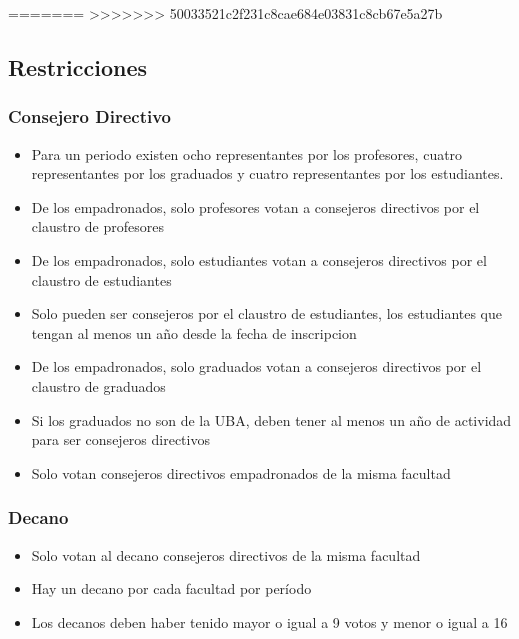 \documentclass[a4paper, 10pt, twoside]{article}
\begin{document}
=======
>>>>>>> 50033521c2f231c8cae684e03831c8cb67e5a27b

\subsection{Restricciones}


\subsubsection{Consejero Directivo}

\begin{itemize}
\item Para un periodo existen ocho representantes por los profesores, cuatro representantes por los graduados y cuatro representantes por los estudiantes.
\item De los empadronados, solo profesores votan a consejeros directivos por el claustro de profesores
\item De los empadronados, solo estudiantes votan a consejeros directivos por el claustro de estudiantes
\item Solo pueden ser consejeros por el claustro de estudiantes, los estudiantes que tengan al menos un año desde la fecha de inscripcion
\item De los empadronados, solo graduados votan a consejeros directivos por el claustro de graduados
\item Si los graduados no son de la UBA, deben tener al menos un año de actividad para ser consejeros directivos
\item Solo votan consejeros directivos empadronados de la misma facultad
\end{itemize}


\subsubsection{Decano}

\begin{itemize}
\item Solo votan al decano consejeros directivos de la misma facultad
\item Hay un decano por cada facultad por período
\item Los decanos deben haber tenido mayor o igual a 9 votos y menor o igual a 16
\end{itemize}
\end{document}
